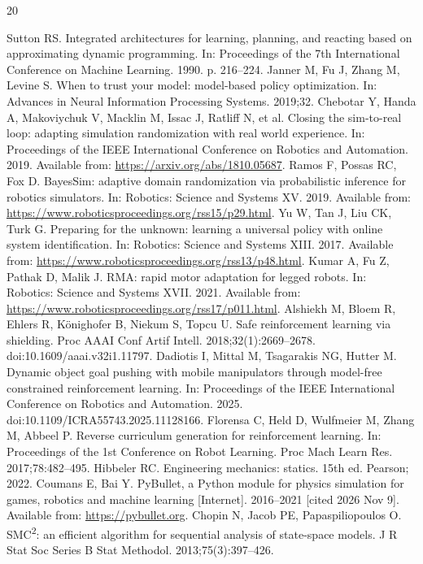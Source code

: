 \documentclass[12pt]{article}
\begin{document}
\clearpage
\begin{thebibliography}{20}\small\raggedright
{} Sutton RS. Integrated architectures for learning, planning, and reacting based on approximating dynamic programming. In: Proceedings of the 7th International Conference on Machine Learning. 1990. p. 216--224.
 Janner M, Fu J, Zhang M, Levine S. When to trust your model: model-based policy optimization. In: Advances in Neural Information Processing Systems. 2019;32.
 Chebotar Y, Handa A, Makoviychuk V, Macklin M, Issac J, Ratliff N, et al. Closing the sim-to-real loop: adapting simulation randomization with real world experience. In: Proceedings of the IEEE International Conference on Robotics and Automation. 2019. Available from: \url{https://arxiv.org/abs/1810.05687}.
 Ramos F, Possas RC, Fox D. BayesSim: adaptive domain randomization via probabilistic inference for robotics simulators. In: Robotics: Science and Systems XV. 2019. Available from: \url{https://www.roboticsproceedings.org/rss15/p29.html}.
 Yu W, Tan J, Liu CK, Turk G. Preparing for the unknown: learning a universal policy with online system identification. In: Robotics: Science and Systems XIII. 2017. Available from: \url{https://www.roboticsproceedings.org/rss13/p48.html}.
 Kumar A, Fu Z, Pathak D, Malik J. RMA: rapid motor adaptation for legged robots. In: Robotics: Science and Systems XVII. 2021. Available from: \url{https://www.roboticsproceedings.org/rss17/p011.html}.
 Alshiekh M, Bloem R, Ehlers R, K\"onighofer B, Niekum S, Topcu U. Safe reinforcement learning via shielding. Proc AAAI Conf Artif Intell. 2018;32(1):2669--2678. doi:10.1609/aaai.v32i1.11797.
 Dadiotis I, Mittal M, Tsagarakis NG, Hutter M. Dynamic object goal pushing with mobile manipulators through model-free constrained reinforcement learning. In: Proceedings of the IEEE International Conference on Robotics and Automation. 2025. doi:10.1109/ICRA55743.2025.11128166.
 Florensa C, Held D, Wulfmeier M, Zhang M, Abbeel P. Reverse curriculum generation for reinforcement learning. In: Proceedings of the 1st Conference on Robot Learning. Proc Mach Learn Res. 2017;78:482--495.
 Hibbeler RC. Engineering mechanics: statics. 15th ed. Pearson; 2022.
 Coumans E, Bai Y. PyBullet, a Python module for physics simulation for games, robotics and machine learning [Internet]. 2016--2021 [cited 2026 Nov 9]. Available from: \url{https://pybullet.org}.
 Chopin N, Jacob PE, Papaspiliopoulos O. SMC\textsuperscript{2}: an efficient algorithm for sequential analysis of state-space models. J R Stat Soc Series B Stat Methodol. 2013;75(3):397--426.

\end{thebibliography}
\end{document}
